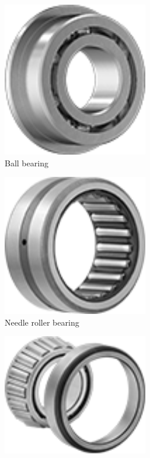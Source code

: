 	\begin{figure}[H]
		\centering
		\begin{subfigure}[b]{.32\linewidth}
			\includegraphics[width=0.7\textwidth]{imgs/ballbearing.png}
			\caption{Ball bearing}
		\end{subfigure}
		\begin{subfigure}[b]{.32\linewidth}
			\includegraphics[width=0.7\textwidth]{imgs/needlebearing.png}
			\caption{Needle	 roller bearing}
		\end{subfigure}
		\begin{subfigure}[b]{.32\linewidth}
			\includegraphics[width=0.7\textwidth]{imgs/tnrbearing.png}

\end{subfigure}
\end{figure}
